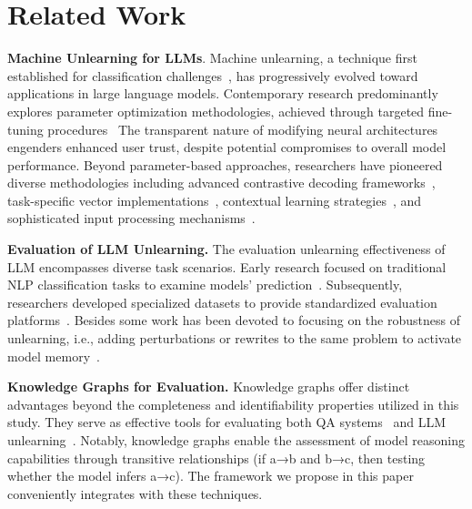 \section{Related Work}
\label{sec:rw}

\noindent\textbf{Machine Unlearning for LLMs}. Machine unlearning, a technique first established for classification challenges~\cite{bourtoule2021machine}, has progressively evolved toward applications in large language models. Contemporary research predominantly explores parameter optimization methodologies, achieved through targeted fine-tuning procedures~\cite{yao2023large, jang2022knowledge,wang2024selective,yao2024machine,tian2024forget, liu2024learning,gu2024second, jia2024soul}
The transparent nature of modifying neural architectures engenders enhanced user trust, despite potential compromises to overall model performance. Beyond parameter-based approaches, researchers have pioneered diverse methodologies including advanced contrastive decoding frameworks~\cite{eldan2023s,wang2024rkld,ji2024reversing,huang2024offsetunlearninglargelanguage}, 
task-specific vector implementations~\cite{liu2024saferlargelanguagemodels,dou2025avoidingcopyrightinfringementlarge}, contextual learning strategies~\cite{pawelczyk2024incontextunlearninglanguagemodels,muresanu2024unlearnablealgorithmsincontextlearning}, and sophisticated input processing mechanisms~\cite{gao2024practicalunlearninglargelanguage, liu2024largelanguagemodelunlearning}. 

\noindent\textbf{Evaluation of LLM Unlearning.}
The evaluation unlearning effectiveness of LLM encompasses diverse task scenarios. Early research focused on traditional NLP classification tasks to examine models' prediction~\cite{chen2023unlearnwantforgetefficient}. Subsequently, researchers developed specialized datasets to provide standardized evaluation platforms~\cite{eldan2023s, shi2024muse,maini2024tofu}. 
Besides some work has been devoted to focusing on the robustness of unlearning, i.e., adding perturbations or rewrites to the same problem to activate model memory~\cite{joshi-etal-2024-towards}.


\noindent\textbf{Knowledge Graphs for Evaluation.}
Knowledge graphs offer distinct advantages beyond the completeness and identifiability properties utilized in this study. They serve as effective tools for evaluating both QA systems~\cite{Wangkgdi2024} and LLM unlearning~\cite{wu2024evaluatingdeepunlearninglarge}. Notably, knowledge graphs enable the assessment of model reasoning capabilities through transitive relationships (if a→b and b→c, then testing whether the model infers a→c).
The framework we propose in this paper conveniently integrates with these techniques.